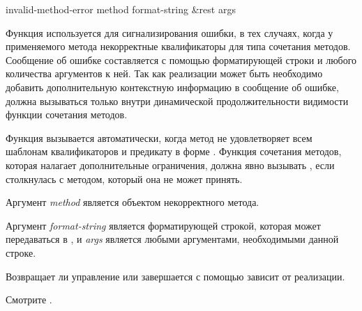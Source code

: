 \begin{defun}[Функция]
invalid-method-error method format-string &rest args

Функция  используется для сигнализирования ошибки, в
тех случаях, когда у применяемого метода некорректные квалификаторы для типа
сочетания методов. Сообщение об ошибке составляется с помощью форматирующей
строки и любого количества аргументов к ней. Так как реализации может быть
необходимо добавить дополнительную контекстную информацию в сообщение об ошибке,
 должна вызываться только внутри динамической
продолжительности видимости функции сочетания методов.

Функция  вызывается автоматически, когда метод не
удовлетворяет всем шаблонам квалификаторов и предикату в форме
.
Функция сочетания методов, которая налагает дополнительные ограничения, должна
явно вызывать , если столкнулась с методом, который
она не может принять.

Аргумент \emph{method} является объектом некорректного метода.

Аргумент \emph{format-string} является форматирующей строкой, которая может
передаваться в , и \emph{args} является любыми аргументами,
необходимыми данной строке.

Возвращает ли  управление или завершается с помощью
 зависит от реализации.

Смотрите  .
\end{defun}

